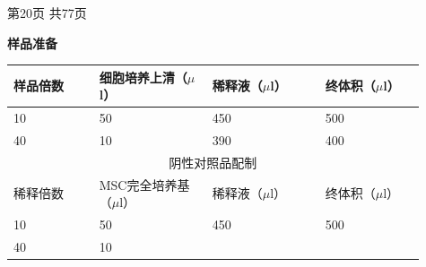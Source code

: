 \documentclass[UTF8,10pt,a4paper,fontset=fandol]{ctexart}
\newcommand{\fieldvalue}[1]{#1}
\newcommand{\handwritten}[1]{#1}
\begin{document}
\begin{center}
第20页 共77页
\end{center}

\newpage

\begin{center}
\textbf{样品准备}
\end{center}

\begin{tabular}{|p{0.19\linewidth}|p{0.25\linewidth}|p{0.25\linewidth}|p{0.22\linewidth}|}
\hline
样品倍数 & 细胞培养上清（$\mu$l） & 稀释液（$\mu$l） & 终体积（$\mu$l）\\
\hline
\fieldvalue{\handwritten{10}} &
\fieldvalue{\handwritten{50}} &
\fieldvalue{\handwritten{450}} &
\fieldvalue{\handwritten{500}}\\
\hline
\fieldvalue{\handwritten{40}} &
\fieldvalue{\handwritten{10}} &
\fieldvalue{\handwritten{390}} &
\fieldvalue{\handwritten{400}}\\
\hline
\multicolumn{4}{|c|}{阴性对照品配制}\\
\hline
稀释倍数 & MSC完全培养基（$\mu$l） & 稀释液（$\mu$l） & 终体积（$\mu$l）\\
\hline
\fieldvalue{\handwritten{10}} &
\fieldvalue{\handwritten{50}} &
\fieldvalue{\handwritten{450}} &
\fieldvalue{\handwritten{500}}\\
\hline
\fieldvalue{\handwritten{40}} &
\fieldvalue{\handwritten{10}} &

\end{tabular}
\end{document}
